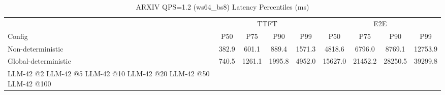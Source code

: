 \begin{table}[htbp]
\centering
\caption{ARXIV QPS=1.2 (ws64_bs8) Latency Percentiles (ms)}
\label{tab:arxiv_qps1.2_ws64_bs8}
\begin{tabular}{l|cccc|cccc}
\toprule
& \multicolumn{4}{c|}{TTFT} & \multicolumn{4}{c}{E2E} \\
Config & P50 & P75 & P90 & P99 & P50 & P75 & P90 & P99 \\
\midrule
Non-deterministic & 382.9 & 601.1 & 889.4 & 1571.3 & 4818.6 & 6796.0 & 8769.1 & 12753.9 \\
Global-deterministic & 740.5 & 1261.1 & 1995.8 & 4952.0 & 15627.0 & 21452.2 & 28250.5 & 39299.8 \\
LLM-42 @2%
LLM-42 @5%
LLM-42 @10%
LLM-42 @20%
LLM-42 @50%
LLM-42 @100%
\bottomrule
\end{tabular}
\end{table}

